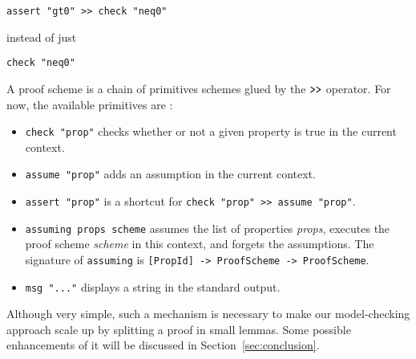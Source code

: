 \begin{lstlisting}[frame=single]
assert "gt0" >> check "neq0"
\end{lstlisting}


instead of just 
\begin{lstlisting}[frame=single] 
  check "neq0" 
\end{lstlisting}
A proof scheme is a chain of
primitives schemes glued by the $\texttt{\textgreater{}\textgreater{}}$
operator. For now, the available primitives are :

\begin{itemize}
\itemsep1pt\parskip0pt
\item
  \texttt{check "prop"} checks whether or not a given property is true
  in the current context.
\item
  \texttt{assume "prop"} adds an assumption in the current context.
\item
  \texttt{assert "prop"} is a shortcut for
  \texttt{check "prop" \textgreater{}\textgreater{} assume "prop"}.
\item

\texttt{assuming props scheme} assumes the list of
  properties \emph{props}, executes the proof scheme \emph{scheme} in
  this context, and forgets the assumptions. The signature of \texttt{assuming} is  
 {\texttt{{[}PropId{]} -\textgreater{} ProofScheme -\textgreater{} ProofScheme}}.

\item
  \texttt{msg "..."} displays a string in the standard output.
\end{itemize}

Although very simple, such a mechanism is necessary to make our model-checking approach scale up by splitting a proof in small lemmas. Some possible enhancements of it will be discussed in Section~\ref{sec:conclusion}.
